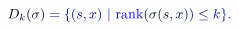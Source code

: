 \documentclass[12pt]{article}
\begin{document}
\makeatletter
\renewcommand*{\@textcolor}[3]{%
  \protect\leavevmode
  \begingroup
    \color#1{#2}#3%
  \endgroup
}
\makeatother
\begin{displaymath}
\mathcolor[RGB]{0,0,15}{D} _ { \mathcolor[RGB]{0,0,30}{k} } \mathcolor[RGB]{0,0,45}{(} \mathcolor[RGB]{0,0,60}{\sigma} \mathcolor[RGB]{0,0,75}{)} \mathcolor[RGB]{0,0,90}{=} \mathcolor[RGB]{0,0,105}{\{} \mathcolor[RGB]{0,0,120}{(} \mathcolor[RGB]{0,0,135}{s} \mathcolor[RGB]{0,0,150}{,} \mathcolor[RGB]{0,0,165}{x} \mathcolor[RGB]{0,0,180}{)} ~ \mathcolor[RGB]{0,0,195}{|} ~ \mathrm { \mathcolor[RGB]{0,0,210}{r} \mathcolor[RGB]{0,0,225}{a} \mathcolor[RGB]{0,0,240}{n} \mathcolor[RGB]{0,0,255}{k} } \mathcolor[RGB]{0,15,0}{(} \mathcolor[RGB]{0,15,15}{\sigma} \mathcolor[RGB]{0,15,30}{(} \mathcolor[RGB]{0,15,45}{s} \mathcolor[RGB]{0,15,60}{,} \mathcolor[RGB]{0,15,75}{x} \mathcolor[RGB]{0,15,90}{)} \mathcolor[RGB]{0,15,105}{)} \mathcolor[RGB]{0,15,120}{\leq} \mathcolor[RGB]{0,15,135}{k} \mathcolor[RGB]{0,15,150}{\}} \mathcolor[RGB]{0,15,165}{.}
\end{displaymath}
\end{document}
